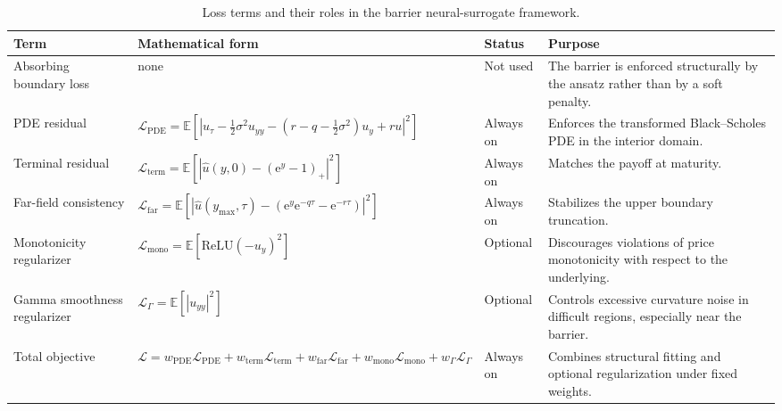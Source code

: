 \begin{table}
\caption{Loss terms and their roles in the barrier neural-surrogate framework.}
\label{tab:chapter4_losses}
\begin{tabular}{llll}
\toprule
Term & Mathematical form & Status & Purpose \\
\midrule
Absorbing boundary loss & $\text{none}$ & Not used & The barrier is enforced structurally by the ansatz rather than by a soft penalty. \\
PDE residual & $\mathcal{L}_{\mathrm{PDE}}=\mathbb{E}\!\left[|u_\tau-\frac12\sigma^2u_{yy}-(r-q-\frac12\sigma^2)u_y+ru|^2\right]$ & Always on & Enforces the transformed Black--Scholes PDE in the interior domain. \\
Terminal residual & $\mathcal{L}_{\mathrm{term}}=\mathbb{E}[|\hat u(y,0)-(\mathrm{e}^y-1)_+|^2]$ & Always on & Matches the payoff at maturity. \\
Far-field consistency & $\mathcal{L}_{\mathrm{far}}=\mathbb{E}[|\hat u(y_{\max},\tau)-(\mathrm{e}^y\mathrm{e}^{-q\tau}-\mathrm{e}^{-r\tau})|^2]$ & Always on & Stabilizes the upper boundary truncation. \\
Monotonicity regularizer & $\mathcal{L}_{\mathrm{mono}}=\mathbb{E}[\mathrm{ReLU}(-u_y)^2]$ & Optional & Discourages violations of price monotonicity with respect to the underlying. \\
Gamma smoothness regularizer & $\mathcal{L}_{\Gamma}=\mathbb{E}[|u_{yy}|^2]$ & Optional & Controls excessive curvature noise in difficult regions, especially near the barrier. \\
Total objective & $\mathcal{L}=w_{\mathrm{PDE}}\mathcal{L}_{\mathrm{PDE}}+w_{\mathrm{term}}\mathcal{L}_{\mathrm{term}}+w_{\mathrm{far}}\mathcal{L}_{\mathrm{far}}+w_{\mathrm{mono}}\mathcal{L}_{\mathrm{mono}}+w_{\Gamma}\mathcal{L}_{\Gamma}$ & Always on & Combines structural fitting and optional regularization under fixed weights. \\
\bottomrule
\end{tabular}
\end{table}
